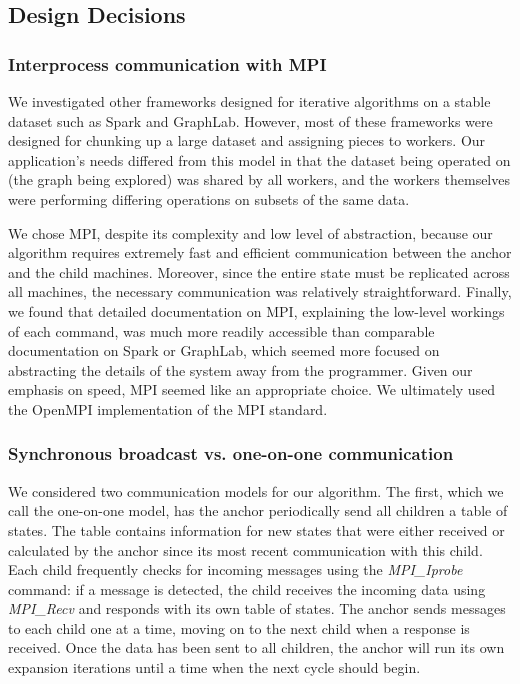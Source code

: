 \documentclass[11pt]{article}
\begin{document}
{\subsection{Design Decisions}

\subsubsection*{Interprocess communication with MPI}

We investigated other frameworks designed for iterative algorithms on a stable dataset such as Spark and GraphLab. However, most of these frameworks were designed for chunking up a large dataset and assigning pieces to workers. Our application's needs differed from this model in that the dataset being operated on (the graph being explored) was shared by all workers, and the workers themselves were performing differing operations on subsets of the same data.

We chose MPI, despite its complexity and low level of abstraction, because our algorithm requires extremely fast and efficient communication between the anchor and the child machines. Moreover, since the entire state must be replicated across all machines, the necessary communication was relatively straightforward. Finally, we found that detailed documentation on MPI, explaining the low-level workings of each command, was much more readily accessible than comparable documentation on Spark or GraphLab, which seemed more focused on abstracting the details of the system away from the programmer. Given our emphasis on speed, MPI seemed like an appropriate choice. We ultimately used the OpenMPI implementation of the MPI standard.

\subsubsection*{Synchronous broadcast vs. one-on-one communication}

We considered two communication models for our algorithm. The first, which we call the one-on-one model, has the anchor periodically send all children a table of states. The table contains information for new states that were either received or calculated by the anchor since its most recent communication with this child. Each child frequently checks for incoming messages using the \emph{MPI\_Iprobe} command: if a message is detected, the child receives the incoming data using \emph{MPI\_Recv} and responds with its own table of states. The anchor sends messages to each child one at a time, moving on to the next child when a response is received. Once the data has been sent to all children, the anchor will run its own expansion iterations until a time when the next cycle should begin.

}
\end{document}
